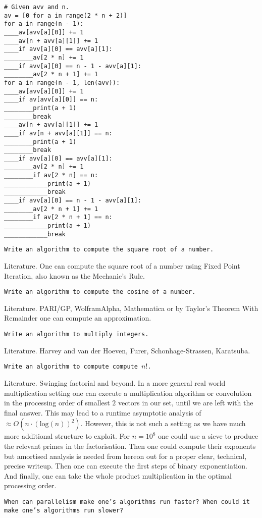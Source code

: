 \begin{verbatim}
# Given avv and n.
av = [0 for a in range(2 * n + 2)]
for a in range(n - 1):
____av[avv[a][0]] += 1
____av[n + avv[a][1]] += 1
____if avv[a][0] == avv[a][1]:
________av[2 * n] += 1
____if avv[a][0] == n - 1 - avv[a][1]:
________av[2 * n + 1] += 1
for a in range(n - 1, len(avv)):
____av[avv[a][0]] += 1
____if av[avv[a][0]] == n:
________print(a + 1)
________break
____av[n + avv[a][1]] += 1
____if av[n + avv[a][1]] == n:
________print(a + 1)
________break
____if avv[a][0] == avv[a][1]:
________av[2 * n] += 1
________if av[2 * n] == n:
____________print(a + 1)
____________break
____if avv[a][0] == n - 1 - avv[a][1]:
________av[2 * n + 1] += 1
________if av[2 * n + 1] == n:
____________print(a + 1)
____________break
\end{verbatim}

\texttt{Write an algorithm to compute the square root of a number.}

Literature. One can compute the square root of a number using Fixed Point Iteration, also known as the Mechanic's Rule.

\texttt{Write an algorithm to compute the cosine of a number.}

Literature. PARI/GP, WolframAlpha, Mathematica or by Taylor's Theorem With Remainder one can compute an approximation.

\texttt{Write an algorithm to multiply integers.}

Literature. Harvey and van der Hoeven, Furer, Schonhage-Strassen, Karatsuba.

\texttt{Write an algorithm to compute compute $n!$.}

Literature. Swinging factorial and beyond. In a more general real world multiplication setting one can execute a multiplication algorithm or convolution in the processing order of smallest $2$ vectors in our set, until we are left with the final answer. This may lead to a runtime asymptotic analysis of $\approx O(n \cdot (\text{log}(n))^2)$. However, this is not such a setting as we have much more additional structure to exploit. For $n=10^8$ one could use a sieve to produce the relevant primes in the factorisation. Then one could compute their exponents but amortised analysis is needed from hereon out for a proper clear, technical, precise writeup. Then one can execute the first steps of binary exponentiation. And finally, one can take the whole product multiplication in the optimal processing order.

\texttt{When can parallelism make one's algorithms run faster? When could it make one's algorithms run slower?}


